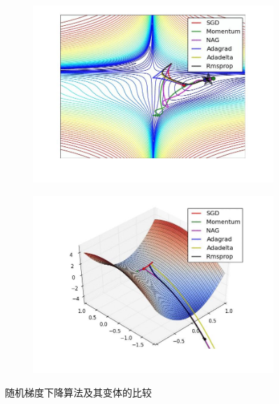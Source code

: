            \begin{figure}[H]
               \centering
               \begin{subfigure}[b]{0.4\textwidth}
                   \includegraphics[width=\textwidth]{images/compare_stochastic1.jpg}
                   \caption{}
                   \label{fig:图1}
               \end{subfigure}
               \begin{subfigure}[b]{0.4\textwidth}
                   \includegraphics[width=\textwidth]{images/compare_stochastic2.jpg}
                   \caption{}
                   \label{fig:图2}
               \end{subfigure}
               \caption{随机梯度下降算法及其变体的比较}
               \label{fig:随机梯度下降算法及其变体的比较}
           \end{figure}
